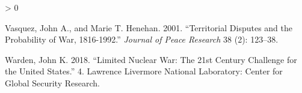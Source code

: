 \documentclass[
]{article}
\newlength{\cslhangindent}
\newenvironment{CSLReferences}[2] %
 {%
  \setlength{\parindent}{0pt}
  \ifodd #1 \everypar{\setlength{\hangindent}{\cslhangindent}}\ignorespaces\fi
  \ifnum #2 > 0
  \setlength{\parskip}{#2\baselineskip}
  \fi
 }%
 {}
\begin{document}
\begin{CSLReferences}{1}{0}
\leavevmode\hypertarget{ref-vasquez_territorialdisputesprobability_2001}{}%
Vasquez, John A., and Marie T. Henehan. 2001. {``Territorial {Disputes} and the {Probability} of {War}, 1816-1992.''} \emph{Journal of Peace Research} 38 (2): 123--38.

\leavevmode\hypertarget{ref-warden_limitednuclearwar_2018}{}%
Warden, John K. 2018. {``Limited {Nuclear War}: {The} 21st {Century Challenge} for the {United States}.''} 4. {Lawrence Livermore National Laboratory}: {Center for Global Security Research}.

\end{CSLReferences}
\end{document}
